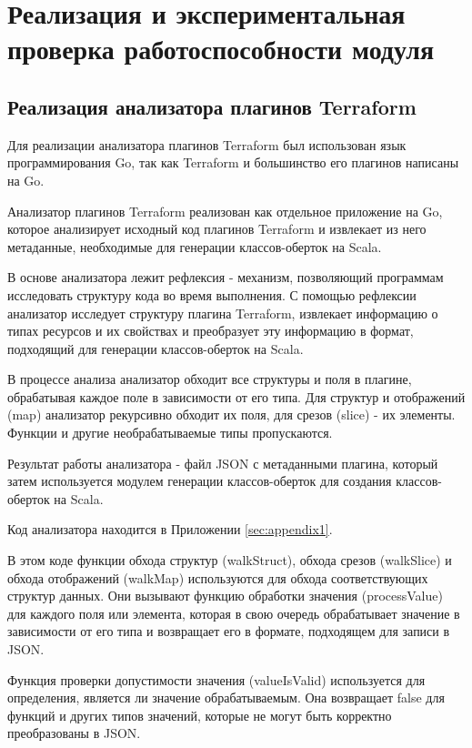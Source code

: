 \chapter{Реализация и экспериментальная проверка работоспособности модуля}

\section{Реализация анализатора плагинов Terraform}

Для реализации анализатора плагинов Terraform был использован язык
программирования Go, так как Terraform и большинство его плагинов написаны на
Go.

Анализатор плагинов Terraform реализован как отдельное приложение на Go, которое
анализирует исходный код плагинов Terraform и извлекает из него метаданные,
необходимые для генерации классов-оберток на Scala.

В основе анализатора лежит рефлексия - механизм, позволяющий программам
исследовать структуру кода во время выполнения. С помощью рефлексии анализатор
исследует структуру плагина Terraform, извлекает информацию о типах ресурсов и
их свойствах и преобразует эту информацию в формат, подходящий для генерации
классов-оберток на Scala.

В процессе анализа анализатор обходит все структуры и поля в плагине,
обрабатывая каждое поле в зависимости от его типа. Для структур и отображений
(map) анализатор рекурсивно обходит их поля, для срезов (slice) - их элементы.
Функции и другие необрабатываемые типы пропускаются.

Результат работы анализатора - файл JSON с метаданными плагина, который затем
используется модулем генерации классов-оберток для создания классов-оберток на
Scala.

Код анализатора находится в Приложении \ref{sec:appendix1}.

В этом коде функции обхода структур (walkStruct), обхода срезов (walkSlice) и
обхода отображений (walkMap) используются для обхода соответствующих структур
данных. Они вызывают функцию обработки значения (processValue) для каждого поля
или элемента, которая в свою очередь обрабатывает значение в зависимости от его
типа и возвращает его в формате, подходящем для записи в JSON.

Функция проверки допустимости значения (valueIsValid) используется для
определения, является ли значение обрабатываемым. Она возвращает false для
функций и других типов значений, которые не могут быть корректно преобразованы в
JSON.

